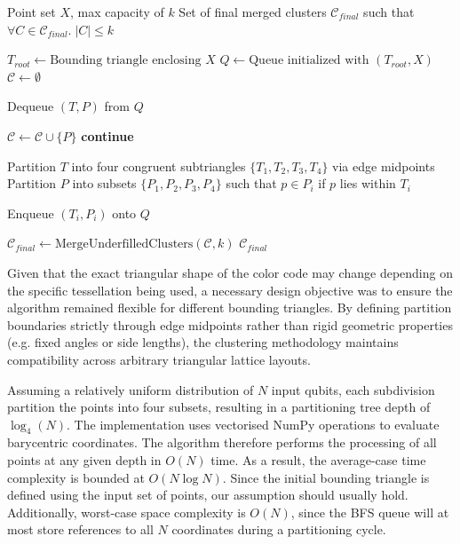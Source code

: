 \begin{algorithm}
\caption{Triangular Clustering Algorithm}
\label{alg:tri_clustering}
\begin{algorithmic}[1]
    \REQUIRE Point set $X$, max capacity of $k$
    \ENSURE Set of final merged clusters $\mathcal{C}_{final}$ such that $\forall C \in \mathcal{C}_{final}.\; |C|\le k$
    
    \STATE $T_{root} \leftarrow \text{Bounding triangle enclosing } X$
    \STATE $Q \leftarrow \text{Queue initialized with } (T_{root}, X)$
    \STATE $\mathcal{C} \leftarrow \emptyset$ 
    
        \STATE Dequeue $(T, P)$ from $Q$
        
            \STATE $\mathcal{C} \leftarrow \mathcal{C} \cup \{P\}$
            \STATE \textbf{continue}
        \ENDIF
        
        \STATE Partition $T$ into four congruent subtriangles $\{T_1, T_2, T_3, T_4\}$ via edge midpoints
        \STATE Partition $P$ into subsets $\{P_1, P_2, P_3, P_4\}$ such that $p \in P_i$ if $p$ lies within $T_i$
        
                \STATE Enqueue $(T_i, P_i)$ onto $Q$
            \ENDIF
        \ENDFOR
    \ENDWHILE
    
    \STATE $\mathcal{C}_{final} \leftarrow \text{MergeUnderfilledClusters}(\mathcal{C}, k)$
    \RETURN $\mathcal{C}_{final}$
\end{algorithmic}
\end{algorithm}


Given that the exact triangular shape of the color code may change depending on the specific tessellation being used, a necessary design objective was to ensure the algorithm remained flexible for different bounding triangles.
By defining partition boundaries strictly through edge midpoints rather than rigid geometric properties (e.g. fixed angles or side lengths), the clustering methodology maintains compatibility across arbitrary triangular lattice layouts. 

Assuming a relatively uniform distribution of $N$  input qubits, each subdivision partition the points into four subsets, resulting in a partitioning tree depth of $\log_4 (N)$. The implementation uses vectorised NumPy operations to evaluate barycentric coordinates. The algorithm therefore performs the processing of all points at any given depth in $O(N)$ time. As a result, the average-case time complexity is bounded at $O(N\log N)$. Since the initial bounding triangle is defined using the input set of points, our assumption should usually hold.
Additionally, worst-case space complexity is $O(N)$, since the BFS queue will at most store references to all $N$ coordinates during a partitioning cycle.

